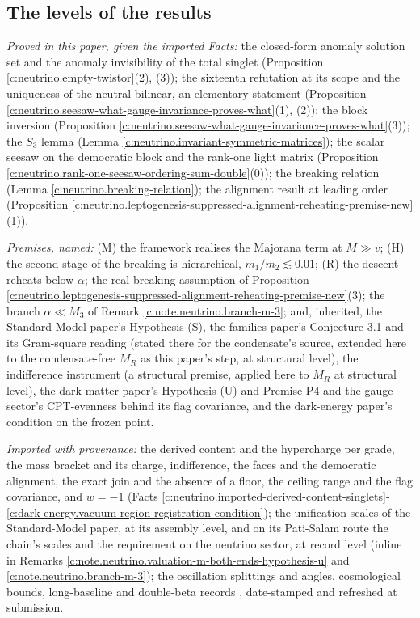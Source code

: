 \documentclass[11pt]{article}
\theoremstyle{definition}
\theoremstyle{plain}
\begin{document}
\subsection*{The levels of the results}
\label{c:note.neutrino.setting-levels-results}
\emph{Proved in this paper, given the imported Facts:} the closed-form anomaly solution set and the anomaly invisibility of the total singlet (Proposition \ref{c:neutrino.empty-twistor}(2), (3)); the sixteenth refutation at its scope and the uniqueness of the neutral bilinear, an elementary statement (Proposition \ref{c:neutrino.seesaw-what-gauge-invariance-proves-what}(1), (2)); the block inversion (Proposition \ref{c:neutrino.seesaw-what-gauge-invariance-proves-what}(3)); the $S_{3}$ lemma (Lemma \ref{c:neutrino.invariant-symmetric-matrices}); the scalar seesaw on the democratic block and the rank-one light matrix (Proposition \ref{c:neutrino.rank-one-seesaw-ordering-sum-double}(0)); the breaking relation (Lemma \ref{c:neutrino.breaking-relation}); the alignment result at leading order (Proposition \ref{c:neutrino.leptogenesis-suppressed-alignment-reheating-premise-new}(1)).

\emph{Premises, named:} (M) the framework realises the Majorana term at $M \gg v$; (H) the second stage of the breaking is hierarchical, $m_{1}/m_{2} \lesssim 0.01$; (R) the descent reheats below $\alpha$; the real-breaking assumption of Proposition \ref{c:neutrino.leptogenesis-suppressed-alignment-reheating-premise-new}(3); the branch $\alpha \ll M_{3}$ of Remark \ref{c:note.neutrino.branch-m-3}; and, inherited, the Standard-Model paper's Hypothesis (S), the families paper's Conjecture 3.1 and its Gram-square reading (stated there for the condensate's source, extended here to the condensate-free $M_{R}$ as this paper's step, at structural level), the indifference instrument (a structural premise, applied here to $M_{R}$ at structural level), the dark-matter paper's Hypothesis (U) and Premise P4 and the gauge sector's CPT-evenness behind its flag covariance, and the dark-energy paper's condition on the frozen point.

\emph{Imported with provenance:} the derived content and the hypercharge per grade, the mass bracket and its charge, indifference, the faces and the democratic alignment, the exact join and the absence of a floor, the ceiling range and the flag covariance, and $w = -1$ (Facts \ref{c:neutrino.imported-derived-content-singlets}-\ref{c:dark-energy.vacuum-region-registration-condition}); the unification scales of the Standard-Model paper, at its assembly level, and on its Pati-Salam route the chain's scales and the requirement on the neutrino sector, at record level (inline in Remarks \ref{c:note.neutrino.valuation-m-both-ends-hypothesis-u} and \ref{c:note.neutrino.branch-m-3}); the oscillation splittings and angles, cosmological bounds, long-baseline and double-beta records \cite{PDG2024, NuFIT2024, DESI2025, HouWangZhaoZhang2026, T2KNOvA2025, KamLANDZen2023, LEGEND2021}, date-stamped and refreshed at submission.
\end{document}
